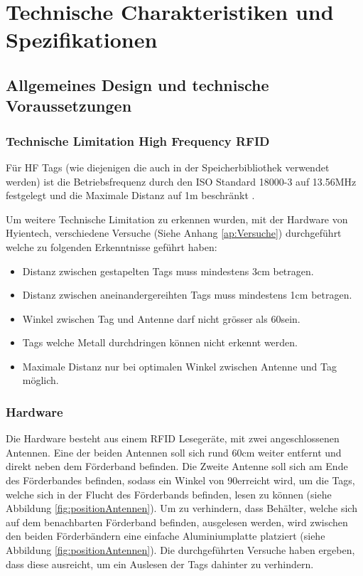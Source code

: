 \chapter{Technische Charakteristiken und Spezifikationen}

\section{Allgemeines Design und technische Voraussetzungen}

\subsection{Technische Limitation High Frequency RFID}
Für HF Tags (wie diejenigen die auch in der Speicherbibliothek verwendet werden) ist die Betriebsfrequenz durch den ISO Standard 18000-3 auf 13.56MHz festgelegt und die Maximale Distanz auf 1m beschränkt \parencite{chawla2007}.

Um weitere Technische Limitation zu erkennen wurden, mit der Hardware von Hyientech, verschiedene Versuche (Siehe Anhang \ref{ap:Versuche}) durchgeführt welche zu folgenden Erkenntnisse geführt haben:
\begin{itemize}
	\item Distanz zwischen gestapelten Tags muss mindestens 3cm betragen.
	\item Distanz zwischen aneinandergereihten Tags muss mindestens 1cm betragen.
	\item Winkel zwischen Tag und Antenne darf nicht grösser als 60\SIUnitSymbolDegree sein.
	\item Tags welche Metall durchdringen können nicht erkennt werden.
	\item Maximale Distanz nur bei optimalen Winkel zwischen Antenne und Tag möglich.
\end{itemize}

\subsection{Hardware}
Die Hardware besteht aus einem RFID Lesegeräte, mit zwei angeschlossenen Antennen. Eine der beiden Antennen soll sich rund 60cm weiter entfernt und direkt neben dem Förderband befinden. Die Zweite Antenne soll sich am Ende des Förderbandes befinden, sodass ein Winkel von 90\SIUnitSymbolDegree erreicht wird, um die Tags, welche sich in der Flucht des Förderbands befinden, lesen zu können (siehe Abbildung \ref{fig:positionAntennen}). Um zu verhindern, dass Behälter, welche sich auf dem benachbarten Förderband befinden, ausgelesen werden, wird zwischen den beiden Förderbändern eine einfache Aluminiumplatte platziert (siehe Abbildung \ref{fig:positionAntennen}). Die durchgeführten Versuche haben ergeben, dass diese ausreicht, um ein Auslesen der Tags dahinter zu verhindern.

